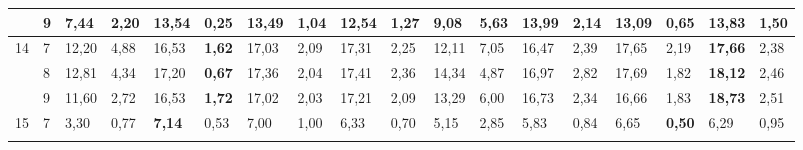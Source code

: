 \documentclass[conference]{IEEEtran}
\begin{document}
\begin{table}[]
\begin{tabular}{|cl|ll|ll|ll|ll|ll|ll|ll|ll|}
		\multicolumn{1}{|c|}{}                    & 9          & \multicolumn{1}{l|}{7,44}          & 2,20          & \multicolumn{1}{l|}{13,54}          & \textbf{0,25} & \multicolumn{1}{l|}{13,49}          & 1,04          & \multicolumn{1}{l|}{12,54}         & 1,27          & \multicolumn{1}{l|}{9,08}                 & 5,63 & \multicolumn{1}{l|}{\textbf{13,99}} & 2,14 & \multicolumn{1}{l|}{13,09}          & 0,65          & \multicolumn{1}{l|}{13,83}          & 1,50 \\ \hline
		\multicolumn{1}{|c|}{\multirow{3}{*}{14}} & 7          & \multicolumn{1}{l|}{12,20}         & 4,88          & \multicolumn{1}{l|}{16,53}          & \textbf{1,62} & \multicolumn{1}{l|}{17,03}          & 2,09          & \multicolumn{1}{l|}{17,31}         & 2,25          & \multicolumn{1}{l|}{12,11}                & 7,05 & \multicolumn{1}{l|}{16,47}          & 2,39 & \multicolumn{1}{l|}{17,65}          & 2,19          & \multicolumn{1}{l|}{\textbf{17,66}} & 2,38 \\ \cline{2-18} 
		\multicolumn{1}{|c|}{}                    & 8          & \multicolumn{1}{l|}{12,81}         & 4,34          & \multicolumn{1}{l|}{17,20}          & \textbf{0,67} & \multicolumn{1}{l|}{17,36}          & 2,04          & \multicolumn{1}{l|}{17,41}         & 2,36          & \multicolumn{1}{l|}{14,34}                & 4,87 & \multicolumn{1}{l|}{16,97}          & 2,82 & \multicolumn{1}{l|}{17,69}          & 1,82          & \multicolumn{1}{l|}{\textbf{18,12}} & 2,46 \\ \cline{2-18} 
		\multicolumn{1}{|c|}{}                    & 9          & \multicolumn{1}{l|}{11,60}         & 2,72          & \multicolumn{1}{l|}{16,53}          & \textbf{1,72} & \multicolumn{1}{l|}{17,02}          & 2,03          & \multicolumn{1}{l|}{17,21}         & 2,09          & \multicolumn{1}{l|}{13,29}                & 6,00 & \multicolumn{1}{l|}{16,73}          & 2,34 & \multicolumn{1}{l|}{16,66}          & 1,83          & \multicolumn{1}{l|}{\textbf{18,73}} & 2,51 \\ \hline
		\multicolumn{1}{|c|}{\multirow{3}{*}{15}} & 7          & \multicolumn{1}{l|}{3,30}          & 0,77          & \multicolumn{1}{l|}{\textbf{7,14}}  & 0,53          & \multicolumn{1}{l|}{7,00}           & 1,00          & \multicolumn{1}{l|}{6,33}          & 0,70          & \multicolumn{1}{l|}{5,15}                 & 2,85 & \multicolumn{1}{l|}{5,83}           & 0,84 & \multicolumn{1}{l|}{6,65}           & \textbf{0,50} & \multicolumn{1}{l|}{6,29}           & 0,95 \\ \cline{2-18} 

\end{tabular}
\end{table}
\end{document}
